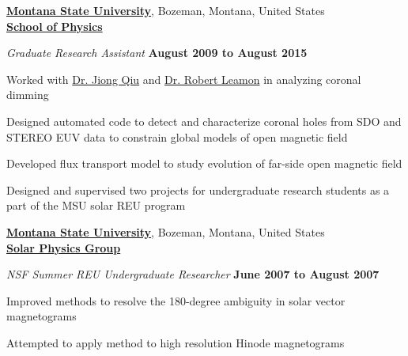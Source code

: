 \documentclass[10pt]{article}
\newenvironment{outerlist}[1][\enskip\textbullet]%
        {\begin{enumerate}[#1]}{\end{enumerate}%
         \vspace{-.6\baselineskip}}
\newenvironment{innerlist}[1][\enskip\textbullet]%
        {\begin{compactenum}[#1]}{\end{compactenum}}
\begin{document}
\href{http://www.montana.edu}{\textbf{Montana State University}}, 
Bozeman, Montana, United States\\
\href{http://www.physics.montana.edu}{\textbf{School of Physics}}
\begin{outerlist}
\item[] \textit{Graduate Research Assistant}%
        \hfill \textbf{August 2009 to August 2015}
\begin{innerlist}
  \item Worked with \href{http://solar.physics.montana.edu/qiuj/}{Dr. Jiong Qiu} and \href{http://solar.physics.montana.edu/leamon/}{Dr. Robert Leamon} in analyzing coronal dimming
  \item Designed automated code to detect and characterize coronal holes from SDO and STEREO EUV data to constrain global models of open magnetic field
  \item Developed flux transport model to study evolution of far-side open magnetic field
  \item Designed and supervised two projects for undergraduate research students as a part of the MSU solar REU program
  \\
\end{innerlist}

\end{outerlist}

\href{http://solar.physics.montana.edu/}{\textbf{Montana State University}}, 
Bozeman, Montana, United States\\
\href{http://solar.physics.montana.edu/}{\textbf{Solar Physics Group}}
\begin{outerlist}
\item[] \textit{NSF Summer REU Undergraduate Researcher}%
        \hfill \textbf{June 2007 to August 2007}
\begin{innerlist}

  \item Improved methods to resolve the 180-degree ambiguity in solar vector \mbox{magnetograms}
  \item Attempted to apply method to high resolution Hinode magnetograms
  \\
\end{innerlist}

\end{outerlist}
\end{document}
